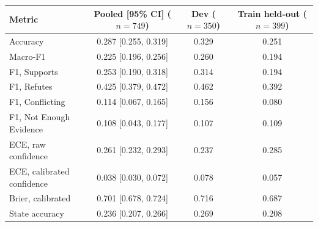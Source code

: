 \begin{tabular}{@{}lccc@{}}
\toprule
Metric & Pooled [95\% CI] ($n{=}749$) & Dev ($n{=}350$) & Train held-out ($n{=}399$) \\
\midrule
Accuracy & 0.287 [0.255, 0.319] & 0.329 & 0.251 \\
Macro-F1 & 0.225 [0.196, 0.256] & 0.260 & 0.194 \\
F1, Supports & 0.253 [0.190, 0.318] & 0.314 & 0.194 \\
F1, Refutes & 0.425 [0.379, 0.472] & 0.462 & 0.392 \\
F1, Conflicting & 0.114 [0.067, 0.165] & 0.156 & 0.080 \\
F1, Not Enough Evidence & 0.108 [0.043, 0.177] & 0.107 & 0.109 \\
ECE, raw confidence & 0.261 [0.232, 0.293] & 0.237 & 0.285 \\
ECE, calibrated confidence & 0.038 [0.030, 0.072] & 0.078 & 0.057 \\
Brier, calibrated & 0.701 [0.678, 0.724] & 0.716 & 0.687 \\
State accuracy & 0.236 [0.207, 0.266] & 0.269 & 0.208 \\
\bottomrule
\end{tabular}

